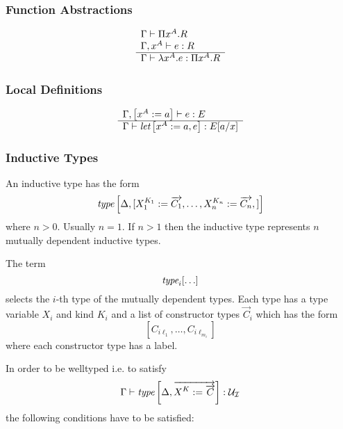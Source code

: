 \subsubsection{Function Abstractions}


$$
\begin{array}{l} 
    \Gamma \vdash \Pi x^A.R
    \\
    \Gamma, x^A \vdash e: R
 \\ \hline 
    \Gamma \vdash \lambda x^A. e : \Pi x^A. R
 \end{array}
$$







\subsubsection{Local Definitions}

$$
\begin{array}{l} 
    \Gamma, \left[ {x^A := a} \right] \vdash e : E
 \\ \hline 
    \Gamma \vdash {\text{\it let}} \left[ {x^A := a, e} \right] : E[a/x]
 \end{array}
$$





\subsubsection{Inductive Types}

An inductive type has the form
$$
{\text{\it type}} \left[ {
    \Delta,
    [
        X_1^{K_1} := {\overrightarrow {C_1}},
        \ldots,
        X_n^{K_n} := {\overrightarrow {C_n}},
    ]
} \right]
$$
where $n > 0$. Usually $n = 1$. If $n > 1$ then the inductive type represents
$n$ mutually dependent inductive types.

The term
$$
    {\text{\it type}}_i [\ldots]
$$
selects the $i$-th type of the mutually dependent types. Each type has a type
variable $X_i$ and kind $K_i$ and a list of constructor types $\vec C_i$ which
has the form
$$
    [
        C_{i \ell_1},
        \ldots,
        C_{i \ell_{m_i}}
    ]
$$
where each constructor type has a label.

In order to be welltyped i.e. to satisfy
$$
    \Gamma
    \vdash
    {\text{\it type}} \left[ {
        \Delta,
        {\overrightarrow {
            X^K := {\overrightarrow {C}}
        }}
    } \right]
    :
    {{\mathcal U}_\mathcal I}
$$
the following conditions have to be satisfied:

